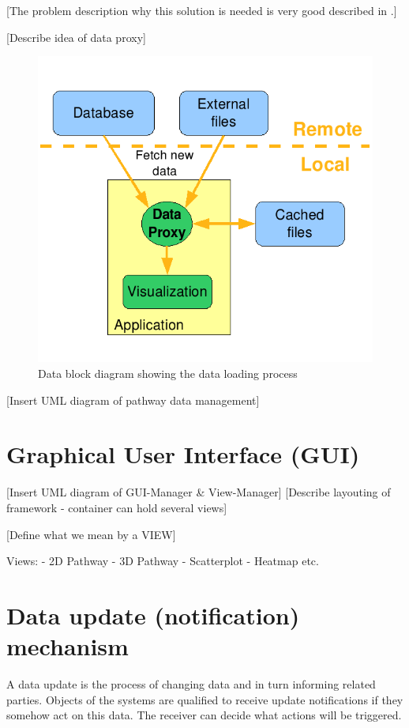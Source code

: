 [The problem description why this solution is needed is very good described in \citep{Bourqui2006}.]

[Describe idea of data proxy]

\begin{figure}[ht]
  \centering
    \includegraphics[width=0.5\linewidth]{gfx/data_block_diagram_new}
  \caption{Data block diagram showing the data loading process}
  \label{fig:data_block_diagram}
\end{figure}

[Insert UML diagram of pathway data management]



\section{Graphical User Interface (GUI)}

[Insert UML diagram of GUI-Manager \& View-Manager]
[Describe layouting of framework - container can hold several views]

[Define what we mean by a VIEW]

Views:
- 2D Pathway
- 3D Pathway
- Scatterplot
- Heatmap etc.


\section{Data update (notification) mechanism}

A data update is the process of changing data and in turn informing related parties. Objects of the systems are qualified to receive update notifications if they somehow act on this data. The receiver can decide what actions will be triggered.
 
